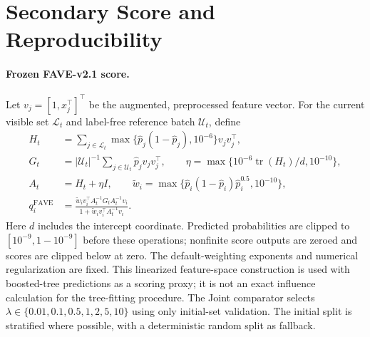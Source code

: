 \appendix
\section{Secondary Score and Reproducibility}
\label{app:fave}\label{app:repro}
\paragraph{Frozen FAVE-v2.1 score.}
Let $v_j=[1,x_j^\top]^\top$ be the augmented, preprocessed feature vector. For the current visible set $\mathcal L_t$ and label-free reference batch $\mathcal U_t$, define
\begin{align}
H_t&=\sum_{j\in\mathcal L_t}\max\{\widehat p_j(1-\widehat p_j),10^{-6}\}v_jv_j^\top,\\
G_t&=|\mathcal U_t|^{-1}\sum_{j\in\mathcal U_t}\widehat p_jv_jv_j^\top,\qquad
\eta=\max\{10^{-6}\operatorname{tr}(H_t)/d,10^{-10}\},\\
A_t&=H_t+\eta I,\qquad
\widetilde w_i=\max\{\widehat p_i(1-\widehat p_i)\widehat p_i^{0.5},10^{-10}\},\\
q_i^{\mathrm{FAVE}}&=
\frac{\widetilde w_i v_i^\top A_t^{-1}G_t A_t^{-1}v_i}
{1+\widetilde w_i v_i^\top A_t^{-1}v_i}.
\end{align}
Here $d$ includes the intercept coordinate. Predicted probabilities are clipped to $[10^{-9},1-10^{-9}]$ before these operations; nonfinite score outputs are zeroed and scores are clipped below at zero. The default-weighting exponents and numerical regularization are fixed. This linearized feature-space construction is used with boosted-tree predictions as a scoring proxy; it is not an exact influence calculation for the tree-fitting procedure. The Joint comparator selects $\lambda\in\{0.01,0.1,0.5,1,2,5,10\}$ using only initial-set validation. The initial split is stratified where possible, with a deterministic random split as fallback.

